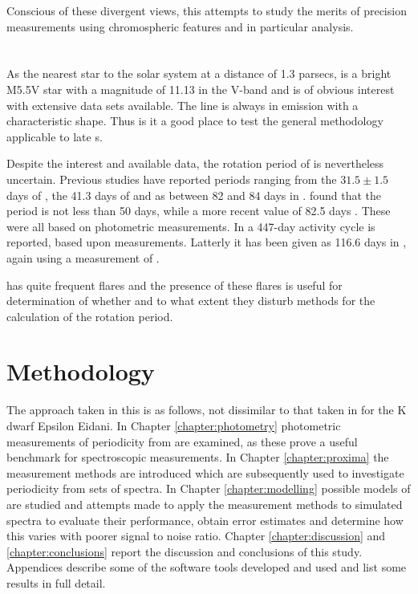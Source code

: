 Conscious of these divergent views, this {\paperorthesis} attempts to study the merits of precision measurements using
chromospheric features and in particular {\ha} analysis.

\section{\prox}
\protect\label{section:introprox}

As the nearest star to the solar system at a distance of 1.3 parsecs, {\prox} is a bright M5.5V star with a magnitude of
11.13 in the V-band and is of obvious interest with extensive data sets available. The {\ha} line is always in emission
with a characteristic shape. Thus is it a good place to test the general methodology applicable to late \rdwarf s.

Despite the interest and available data, the rotation period of {\prox} is nevertheless uncertain.  Previous studies
have reported periods ranging from the $ 31.5 \pm 1.5 $ days of \citet{guinan96}, the 41.3 days of \citet{benedict93} and
as between 82 and 84 days in \citealt{benedict92,benedict98}.  \citet{kurster99} found that the period is not less than
50 days, while a more recent value of 82.5 days \citep{kiraga07}. These were all based on photometric measurements.
In \citet{cincunegui07} a 447-day activity cycle is reported, based upon {\ha} measurements. Latterly it has been given
as 116.6 days in \citet[Table 3]{suarezmascareno15}, again using a measurement of {\ha}.

{\prox} has quite frequent flares and the presence of these flares is useful for determination of whether and to what
extent they disturb methods for the calculation of the rotation period.

\section{Methodology}
\protect\label{section:methodology}

The approach taken in this {\paperorthesis} is as follows, not dissimilar to that taken in \citet{giguere16} for the K
dwarf Epsilon Eidani. In Chapter \ref{chapter:photometry} photometric measurements of periodicity from {\prox} are
examined, as these prove a useful benchmark for spectroscopic measurements. In Chapter \ref{chapter:proxima} the
measurement methods are introduced which are subsequently used to investigate periodicity from sets of spectra. In
Chapter \ref{chapter:modelling} possible models of {\prox} are studied and attempts made to apply the measurement
methods to simulated spectra to evaluate their performance, obtain error estimates and determine how this varies with
poorer signal to noise ratio. Chapter \ref{chapter:discussion} and \ref{chapter:conclusions} report the discussion and
conclusions of this study. Appendices describe some of the software tools developed and used and list some results in
full detail.

